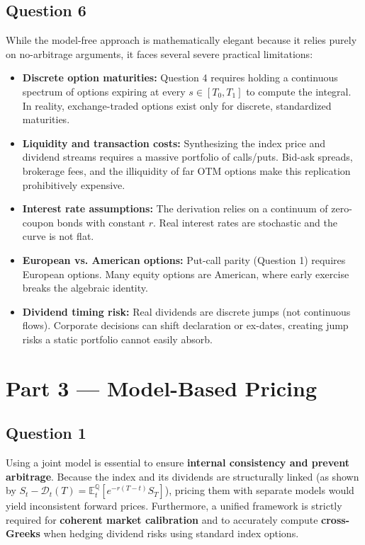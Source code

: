 \documentclass[12pt,a4paper]{article}
\begin{document}
\subsection*{Question 6}

While the model-free approach is mathematically elegant because it relies purely on no-arbitrage arguments, it faces several severe practical limitations:

\begin{itemize}
    \item \textbf{Discrete option maturities:} Question 4 requires holding a continuous spectrum of options expiring at every $s \in [T_0, T_1]$ to compute the integral. In reality, exchange-traded options exist only for discrete, standardized maturities.
    \item \textbf{Liquidity and transaction costs:} Synthesizing the index price and dividend streams requires a massive portfolio of calls/puts. Bid-ask spreads, brokerage fees, and the illiquidity of far OTM options make this replication prohibitively expensive.
    \item \textbf{Interest rate assumptions:} The derivation relies on a continuum of zero-coupon bonds with constant $r$. Real interest rates are stochastic and the curve is not flat.
    \item \textbf{European vs. American options:} Put-call parity (Question 1) requires European options. Many equity options are American, where early exercise breaks the algebraic identity.
    \item \textbf{Dividend timing risk:} Real dividends are discrete jumps (not continuous flows). Corporate decisions can shift declaration or ex-dates, creating jump risks a static portfolio cannot easily absorb.
\end{itemize}

\section*{Part 3 --- Model-Based Pricing}

\subsection*{Question 1}

Using a joint model is essential to ensure \textbf{internal consistency and prevent arbitrage}. Because the index and its dividends are structurally linked (as shown by $S_t - \mathcal{D}_t(T) = \mathbb{E}^{\mathbb{Q}}_t[e^{-r(T-t)}S_T]$), pricing them with separate models would yield inconsistent forward prices. Furthermore, a unified framework is strictly required for \textbf{coherent market calibration} and to accurately compute \textbf{cross-Greeks} when hedging dividend risks using standard index options.
\end{document}
